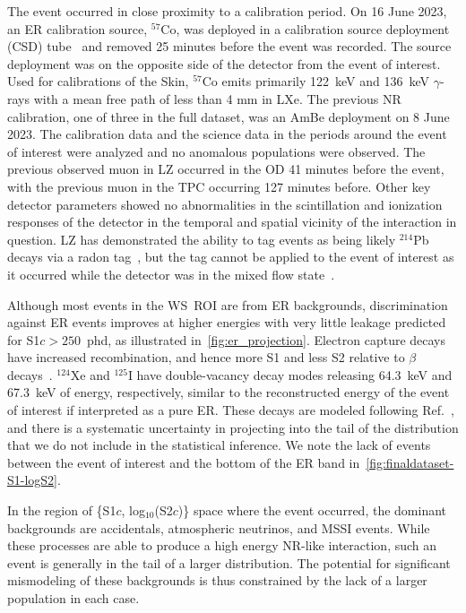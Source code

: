 The event occurred in close proximity to a calibration period. On 16 June 2023, an ER calibration source, $^{57}$Co, was deployed in a calibration source deployment (CSD) tube~\cite{LZ:Calibrations_2024} and removed 25 minutes before the event was recorded. The source deployment was on the opposite side of the detector from the event of interest. Used for calibrations of the Skin, $^{57}$Co emits primarily 122~keV and 136~keV $\gamma$-rays with a mean free path of less than 4 mm in LXe.
The previous NR calibration, one of three in the full dataset, was an AmBe deployment on 8 June 2023. 
The calibration data and the science data in the periods around the event of interest were analyzed and no anomalous populations were observed. The previous observed muon in LZ occurred in the OD 41 minutes before the event, with the previous muon in the TPC occurring 127 minutes before.
Other key detector parameters showed no abnormalities in the scintillation and ionization responses of the detector in the temporal and spatial vicinity of the interaction in question. LZ has demonstrated the ability to tag events as being likely $^{214}$Pb decays via a radon tag~\cite{LZ:2025xxf}, but the tag cannot be applied to the event of interest as it occurred while the detector was in the mixed flow state~\cite{LZ:SR3_WS2024}.

Although most events in the WS~ROI are from ER backgrounds, discrimination against ER events improves at higher energies with very little leakage predicted for S1$c>250$~phd, as illustrated in~\autoref{fig:er_projection}. Electron capture decays have increased recombination, and hence more S1 and less S2 relative to $\beta$ decays~\cite{LZ:2025hud}.  $^{124}$Xe and $^{125}$I have double-vacancy decay modes releasing 64.3~keV and 67.3~keV of energy, respectively, similar to the reconstructed energy of the event of interest if interpreted as a pure ER. These decays are modeled following Ref.~\cite{LZ:2025hud}, and there is a systematic uncertainty in projecting into the tail of the distribution that we do not include in the statistical inference. We note the lack of events between the event of interest and the bottom of the ER band in~\autoref{fig:finaldataset-S1-logS2}.

In the region of \{S1$c$, log$_{10}$(S2$c$)\} space where the event occurred, the dominant backgrounds are accidentals, atmospheric neutrinos, and MSSI events. 
While these processes are able to produce a high energy NR-like interaction, such an event is generally in the tail of a larger distribution. 
The potential for significant mismodeling of these backgrounds is thus constrained by the lack of a larger population in each case. 

